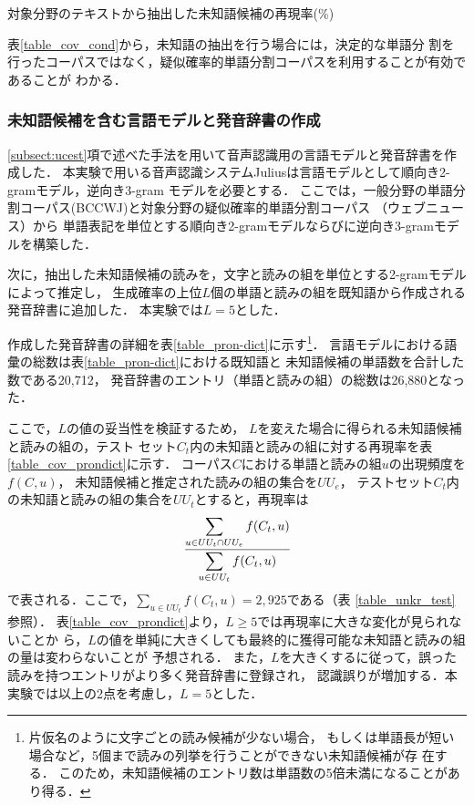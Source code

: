 \documentclass[japanese]{jnlp_1.4}
\begin{document}
\begin{table}[t]
  \caption{対象分野のテキストから抽出した未知語候補の再現率(\%)}

  \label{table_cov_cond}
\end{table}

表\ref{table_cov_cond}から，未知語の抽出を行う場合には，決定的な単語分
割を行ったコーパスではなく，疑似確率的単語分割コーパスを利用することが有効であることが
わかる．



\subsubsection{未知語候補を含む言語モデルと発音辞書の作成}

\ref{subsect:ucest}項で述べた手法を用いて音声認識用の言語モデルと発音辞書を作
成した．
本実験で用いる音声認識システムJuliusは言語モデルとして順向き2-gramモデル，逆向き3-gram
モデルを必要とする．
ここでは，一般分野の単語分割コーパス(BCCWJ)と対象分野の疑似確率的単語分割コーパス
（ウェブニュース）から
単語表記を単位とする順向き2-gramモデルならびに逆向き3-gramモデルを構築した．

次に，抽出した未知語候補の読みを，文字と読みの組を単位とする2-gramモデルによって推定し，
生成確率の上位$L$個の単語と読みの組を既知語から作成される発音辞書に追加した．
本実験では$L=5$とした．


作成した発音辞書の詳細を表\ref{table_pron-dict}に示す\footnote{
片仮名のように文字ごとの読み候補が少ない場合，
もしくは単語長が短い場合など，5個まで読みの列挙を行うことができない未知語候補が存
在する．
このため，未知語候補のエントリ数は単語数の5倍未満になることがあり得る．}．
言語モデルにおける語彙の総数は表\ref{table_pron-dict}における既知語と
未知語候補の単語数を合計した数である20,712，
発音辞書のエントリ（単語と読みの組）の総数は26,880となった．

ここで，$L$の値の妥当性を検証するため，
$L$を変えた場合に得られる未知語候補と読みの組の，テスト
セット$C_t$内の未知語と読みの組に対する再現率を表\ref{table_cov_prondict}に示す．
コーパス$C$における単語と読みの組$u$の出現頻度を$f(C,u)$，
未知語候補と推定された読みの組の集合を$UU_e$，
テストセット$C_t$内の未知語と読みの組の集合を$UU_t$とすると，再現率は
\[
 \cfrac{\displaystyle{\sum_{u \in UU_t \cap UU_e} f(C_t, u)}}{\displaystyle{\sum_{u \in UU_t } f(C_t, u)}}
\]
で表される．ここで，$\sum_{u \in UU_t } f(C_t, u) = 2,925$である（表
\ref{table_unkr_test}参照）．
表\ref{table_cov_prondict}より，$L \geq 5$では再現率に大きな変化が見られないことか
ら，$L$の値を単純に大きくしても最終的に獲得可能な未知語と読みの組の量は変わらないことが
予想される．
また，$L$を大きくするに従って，誤った読みを持つエントリがより多く発音辞書に登録され，
認識誤りが増加する．本実験では以上の2点を考慮し，$L=5$とした．
\end{document}
